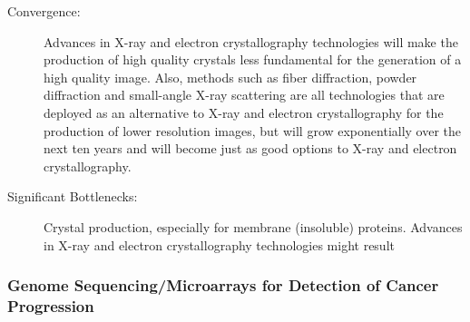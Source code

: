 \begin{description}
\item[Convergence:] Advances in  X-ray and electron crystallography technologies will make the production  of high quality crystals less fundamental for the generation of a high  quality image. Also, methods such as fiber diffraction, powder  diffraction and small-angle X-ray scattering are all technologies that  are deployed as an alternative to X-ray and electron crystallography for  the production of lower resolution images, but will grow exponentially  over the next ten years and will become just as good options to X-ray  and electron crystallography.
 
\item[Significant Bottlenecks:]  Crystal production, especially for membrane (insoluble) proteins.  Advances in X-ray and electron crystallography technologies might result
   \end{description}
 
 
\subsubsection{Genome Sequencing/Microarrays for Detection of Cancer Progression}
 
